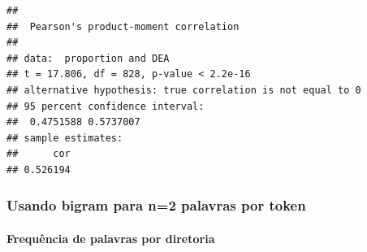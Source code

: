 \documentclass[]{article}
\newenvironment{Shaded}{\begin{snugshade}}{\end{snugshade}}
\newcommand{\KeywordTok}[1]{\textcolor[rgb]{0.13,0.29,0.53}{\textbf{#1}}}
\newcommand{\DataTypeTok}[1]{\textcolor[rgb]{0.13,0.29,0.53}{#1}}
\newcommand{\StringTok}[1]{\textcolor[rgb]{0.31,0.60,0.02}{#1}}
\newcommand{\OperatorTok}[1]{\textcolor[rgb]{0.81,0.36,0.00}{\textbf{#1}}}
\newcommand{\NormalTok}[1]{#1}
\let\oldparagraph\paragraph
\renewcommand{\paragraph}[1]{\oldparagraph{#1}\mbox{}}
\begin{document}
\begin{Shaded}
\end{Shaded}

\begin{verbatim}
## 
##  Pearson's product-moment correlation
## 
## data:  proportion and DEA
## t = 17.806, df = 828, p-value < 2.2e-16
## alternative hypothesis: true correlation is not equal to 0
## 95 percent confidence interval:
##  0.4751588 0.5737007
## sample estimates:
##      cor 
## 0.526194
\end{verbatim}

\subsubsection{Usando bigram para n=2 palavras por
token}\label{usando-bigram-para-n2-palavras-por-token}

\paragraph{Frequência de palavras por
diretoria}\label{frequencia-de-palavras-por-diretoria-1}
\end{document}
